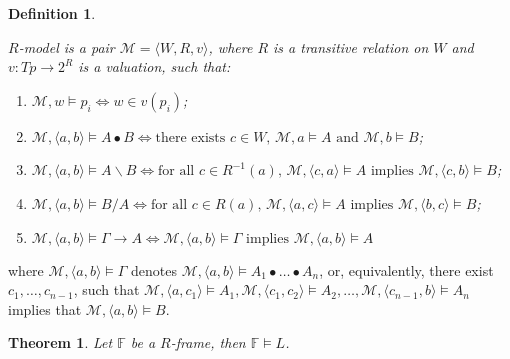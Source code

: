 \documentclass[a4paper]{article}
\theoremstyle{defin}
\newtheorem{defin}{Definition}
\theoremstyle{theorem}
\newtheorem{theorem}{Theorem}
\theoremstyle{prop}
\theoremstyle{lemma}
\theoremstyle{ex}
\theoremstyle{col}
\begin{document}
\begin{defin}
  $ $

  $R$-model is a pair $\mathcal{M} = \langle W, R, v \rangle$,
  where $R$ is a transitive relation on $W$ and $v : Tp \to 2^R$ is a valuation, such that:

  \begin{enumerate}
    \item $\mathcal{M}, w \models p_i \Leftrightarrow w \in v(p_i)$;
    \item $\mathcal{M}, \langle a, b \rangle \models A \bullet B \Leftrightarrow
      \text{there exists $c \in W$, $\mathcal{M}, a \models A$ and $\mathcal{M}, b \models B$}$;
    \item $\mathcal{M}, \langle a, b \rangle \models A \backslash B \Leftrightarrow
      \text{for all $c \in R^{-1}(a)$, $\mathcal{M}, \langle c, a \rangle \models A$ implies
      $\mathcal{M}, \langle c, b \rangle \models B$}$;
    \item $\mathcal{M}, \langle a, b \rangle \models B / A \Leftrightarrow
        \text{for all $c \in R(a)$, $\mathcal{M}, \langle a, c \rangle \models A$ implies
        $\mathcal{M}, \langle b, c \rangle \models B$}$;
    \item $\mathcal{M}, \langle a, b \rangle \models \Gamma \rightarrow A \Leftrightarrow
    \mathcal{M}, \langle a, b \rangle \models \Gamma \text{ implies } \mathcal{M}, \langle a, b \rangle \models A$
  \end{enumerate}
\end{defin}

where $\mathcal{M}, \langle a, b \rangle \models \Gamma$ denotes $\mathcal{M}, \langle a, b \rangle \models A_1 \bullet \dots \bullet A_n$, or,
equivalently, there exist $c_1, \dots, c_{n-1}$, such that $\mathcal{M}, \langle a, c_1 \rangle \models A_1,
\mathcal{M}, \langle c_1, c_2 \rangle \models A_2, \dots, \mathcal{M}, \langle c_{n-1}, b \rangle \models A_n$ implies that
$\mathcal{M}, \langle a, b \rangle \models B$.

\begin{theorem}
  Let $\mathbb{F}$ be a $R$-frame, then $\mathbb{F} \models L$.
\end{theorem}
\end{document}
